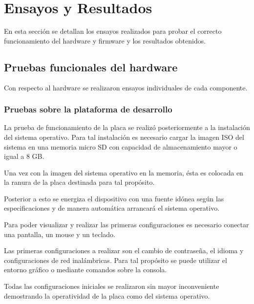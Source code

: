 
\chapter{Ensayos y Resultados} %

\label{Chapter4} %
En esta sección se detallan los ensayos realizados para probar el correcto funcionamiento del hardware y firmware y los resultados obtenidos.

\section{Pruebas funcionales del hardware}
\label{sec:pruebasHW}

Con respecto al hardware se realizaron ensayos individuales de cada componente.
\subsection{Pruebas sobre la plataforma de desarrollo}
La prueba de funcionamiento de la placa se realizó posteriormente a la instalación del sistema operativo. Para tal instalación es necesario cargar la imagen ISO del sistema en una memoria micro SD con capacidad de almacenamiento mayor o igual a 8 GB.

Una vez con la imagen del sistema operativo en la memoria, ésta es colocada en la ranura de la placa destinada para tal propósito.

Posterior a esto se energiza el dispositivo con una fuente idónea según las especificaciones y de manera automática arrancará el sistema operativo.

Para poder visualizar y realizar las primeras configuraciones es necesario conectar una pantalla, un mouse y un teclado.

Las primeras configuraciones a realizar son el cambio de contraseña, el idioma y configuraciones de red inalámbricas. Para tal propósito se puede utilizar el entorno gráfico o mediante comandos sobre la consola.

Todas las configuraciones iniciales se realizaron sin mayor inconveniente demostrando la operatividad de la placa como del sistema operativo.

